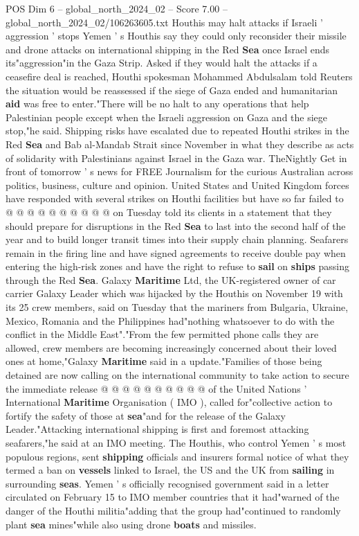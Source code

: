 \begin{textsample}{POS Dim 6 – global\_north\_2024\_02 – Score 7.00 – global\_north\_2024\_02/106263605.txt}  \label{ex:f6_pos_197}
Houthis may halt attacks if Israeli ' aggression ' stops Yemen ' s Houthis say they could only reconsider their missile and drone attacks on international shipping in the Red \textbf{Sea} once Israel ends its"aggression"in the Gaza Strip.
Asked if they would halt the attacks if a ceasefire deal is reached, Houthi spokesman Mohammed Abdulsalam told Reuters the situation would be reassessed if the siege of Gaza ended and humanitarian \textbf{aid} was free to enter."There will be no halt to any operations that help Palestinian people except when the Israeli aggression on Gaza and the siege stop,"he said.
Shipping risks have escalated due to repeated Houthi strikes in the Red \textbf{Sea} and Bab al-Mandab Strait since November in what they describe as acts of solidarity with Palestinians against Israel in the Gaza war.
TheNightly Get in front of tomorrow ' s news for FREE Journalism for the curious Australian across politics, business, culture and opinion.
United States and United Kingdom forces have responded with several strikes on Houthi facilities but have so far failed to @ @ @ @ @ @ @ @ @ @ on Tuesday told its clients in a statement that they should prepare for disruptions in the Red \textbf{Sea} to last into the second half of the year and to build longer transit times into their supply chain planning.
Seafarers remain in the firing line and have signed agreements to receive double pay when entering the high-risk zones and have the right to refuse to \textbf{sail} on \textbf{ships} passing through the Red \textbf{Sea}.
Galaxy \textbf{Maritime} Ltd, the UK-registered owner of car carrier Galaxy Leader which was hijacked by the Houthis on November 19 with its 25 crew members, said on Tuesday that the mariners from Bulgaria, Ukraine, Mexico, Romania and the Philippines had"nothing whatsoever to do with the conflict in the Middle East"."From the few permitted phone calls they are allowed, crew members are becoming increasingly concerned about their loved ones at home,"Galaxy \textbf{Maritime} said in a update."Families of those being detained are now calling on the international community to take action to secure the immediate release @ @ @ @ @ @ @ @ @ @ of the United Nations ' International \textbf{Maritime} Organisation ( IMO ), called for"collective action to fortify the safety of those at \textbf{sea}"and for the release of the Galaxy Leader."Attacking international shipping is first and foremost attacking seafarers,"he said at an IMO meeting.
The Houthis, who control Yemen ' s most populous regions, sent \textbf{shipping} officials and insurers formal notice of what they termed a ban on \textbf{vessels} linked to Israel, the US and the UK from \textbf{sailing} in surrounding \textbf{seas}.
Yemen ' s officially recognised government said in a letter circulated on February 15 to IMO member countries that it had"warned of the danger of the Houthi militia"adding that the group had"continued to randomly plant \textbf{sea} mines"while also using drone \textbf{boats} and missiles.

\end{textsample}
